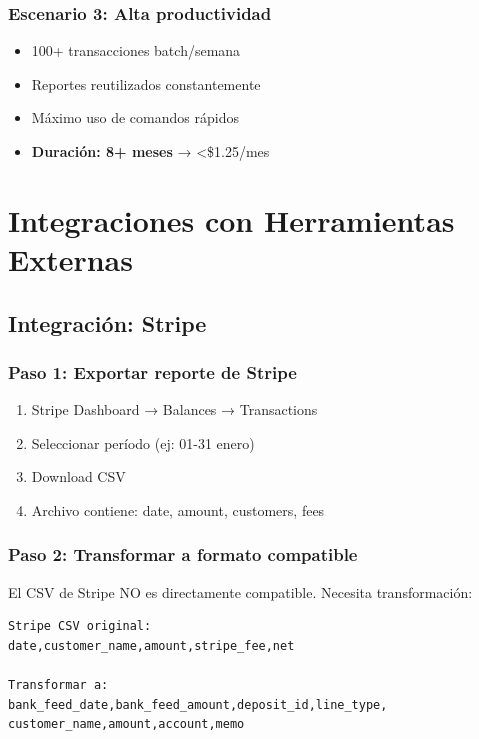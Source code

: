 \documentclass[12pt,oneside]{article}
\begin{document}
\subsubsection{Escenario 3: Alta productividad}

\begin{itemize}
    \item 100+ transacciones batch/semana
    \item Reportes reutilizados constantemente
    \item Máximo uso de comandos rápidos
    \item \textbf{Duración: 8+ meses} → <\$1.25/mes
\end{itemize}

\newpage

\section{Integraciones con Herramientas Externas}

\subsection{Integración: Stripe}

\subsubsection{Paso 1: Exportar reporte de Stripe}

\begin{enumerate}
    \item Stripe Dashboard → Balances → Transactions
    \item Seleccionar período (ej: 01-31 enero)
    \item Download CSV
    \item Archivo contiene: date, amount, customers, fees
\end{enumerate}

\subsubsection{Paso 2: Transformar a formato compatible}

El CSV de Stripe NO es directamente compatible. Necesita transformación:

\begin{verbatim}
Stripe CSV original:
date,customer_name,amount,stripe_fee,net

Transformar a:
bank_feed_date,bank_feed_amount,deposit_id,line_type,
customer_name,amount,account,memo
\end{verbatim}
\end{document}
